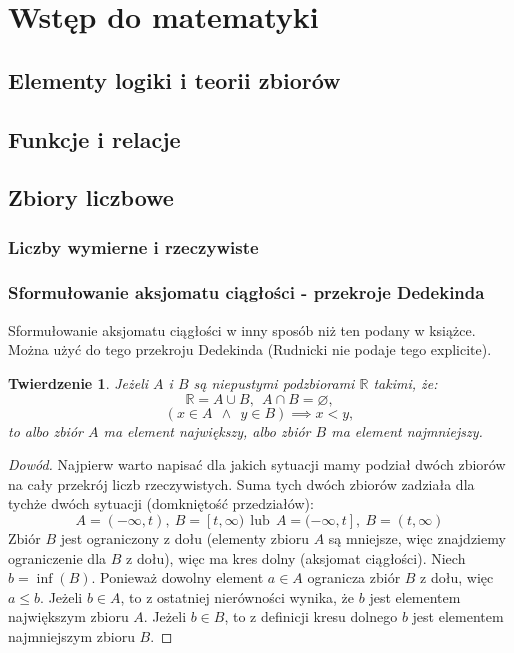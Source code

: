 \documentclass{article}
\newtheorem*{theorem}{Twierdzenie}
\begin{document}
\tableofcontents


\section{Wstęp do matematyki}
\subsection{Elementy logiki i teorii zbiorów}

\subsection{Funkcje i relacje}

\subsection{Zbiory liczbowe}
\subsubsection{Liczby wymierne i rzeczywiste}
\subsubsection{Sformułowanie aksjomatu ciągłości - przekroje Dedekinda}
Sformułowanie aksjomatu ciągłości w inny sposób niż ten podany w książce. Można użyć do tego
przekroju Dedekinda (Rudnicki nie podaje tego explicite).

\begin{theorem}
    Jeżeli \(A\) i \(B\) są niepustymi podzbiorami \(\mathbb{R}\) takimi, że:
    \begin{equation}
        \mathbb{R} = A \cup B, \ \ A \cap B = \varnothing,
    \end{equation}
    \begin{equation}
        (x \in A \ \ \land \ \ y \in B) \implies x < y,
    \end{equation}
    to albo zbiór \(A\) ma element największy, albo zbiór \(B\) ma element najmniejszy.
\end{theorem}
\begin{proof}[Dowód]
    Najpierw warto napisać dla jakich sytuacji mamy podział dwóch zbiorów na cały przekrój liczb rzeczywistych.
    Suma tych dwóch zbiorów zadziała dla tychże dwóch sytuacji (domkniętość przedziałów):
    \begin{equation*}
        A=(-\infty, t), \ B=[t,\infty) \ \ \mbox{lub} \ \ A=(-\infty, t], \ B=(t,\infty)
    \end{equation*}
    Zbiór \(B\) jest ograniczony z dołu (elementy zbioru \(A\) są mniejsze, więc znajdziemy ograniczenie dla \(B\) z dołu), 
    więc ma kres dolny (aksjomat ciągłości). Niech \(b = \inf(B)\).
    Ponieważ dowolny element \(a \in A\) ogranicza zbiór \(B\) z dołu, więc \(a \leq b\). Jeżeli \(b \in A\), to z ostatniej
    nierówności wynika, że \(b\) jest elementem największym zbioru \(A\). Jeżeli \(b \in B\), to z definicji kresu dolnego
    \(b\) jest elementem najmniejszym zbioru \(B\). 
\end{proof}
\end{document}
